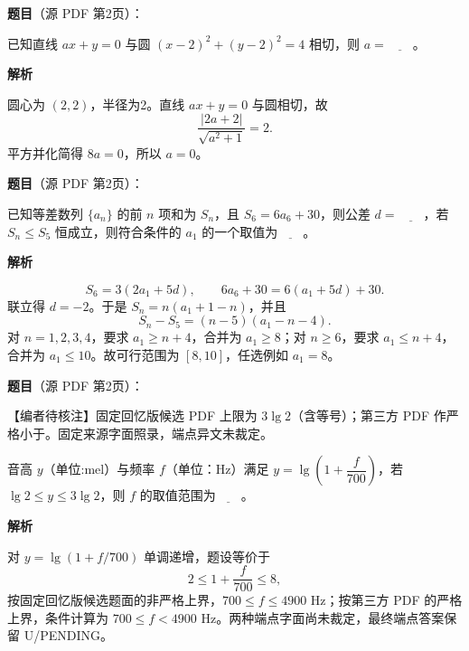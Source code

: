\begin{answer}

\textbf{题目}（源 PDF 第2页）：

已知直线 \(ax+y=0\) 与圆 \((x-2)^2+(y-2)^2=4\) 相切，则 \(a=\underline{\qquad}\)。

\textbf{解析}

圆心为 \((2,2)\)，半径为2。直线 \(ax+y=0\) 与圆相切，故
\nopagebreak[4]
\[
\frac{|2a+2|}{\sqrt{a^2+1}}=2.
\]
平方并化简得 \(8a=0\)，所以 \(a=0\)。


\end{answer}
\begin{answer}

\textbf{题目}（源 PDF 第2页）：

已知等差数列 \(\{a_n\}\) 的前 \(n\) 项和为 \(S_n\)，且 \(S_6=6a_6+30\)，则公差 \(d=\underline{\qquad}\)，若 \(S_n\leq S_5\) 恒成立，则符合条件的 \(a_1\) 的一个取值为\(\underline{\qquad}\)。

\textbf{解析}

\nopagebreak[4]
\[
S_6=3(2a_1+5d),\qquad 6a_6+30=6(a_1+5d)+30.
\]
联立得 \(d=-2\)。于是 \(S_n=n(a_1+1-n)\)，并且
\nopagebreak[4]
\[
S_n-S_5=(n-5)(a_1-n-4).
\]
对 \(n=1,2,3,4\)，要求 \(a_1\ge n+4\)，合并为 \(a_1\ge8\)；对 \(n\ge6\)，要求 \(a_1\le n+4\)，合并为 \(a_1\le10\)。故可行范围为 \([8,10]\)，任选例如 \(a_1=8\)。


\end{answer}
\begin{answer}

\textbf{题目}（源 PDF 第2页）：

\begin{gktip}
【编者待核注】固定回忆版候选 PDF 上限为 \(3\lg 2\)（含等号）；第三方 PDF 作严格小于。固定来源字面照录，端点异文未裁定。
\end{gktip}

音高 \(y\)（单位:mel）与频率 \(f\)（单位：Hz）满足 \(y=\lg\left(1+\dfrac{f}{700}\right)\)，若 \(\lg 2\leq y\leq 3\lg 2\)，则 \(f\) 的取值范围为\(\underline{\qquad}\)。

\textbf{解析}

对 \(y=\lg(1+f/700)\) 单调递增，题设等价于
\nopagebreak[4]
\[
2\le1+\frac f{700}\le8,
\]
按固定回忆版候选题面的非严格上界，\(700\le f\le4900\) Hz；按第三方 PDF 的严格上界，条件计算为 \(700\le f<4900\) Hz。两种端点字面尚未裁定，最终端点答案保留 U/PENDING。

\gkanswer{答案：U/PENDING；固定回忆版候选为 \([700,4900]\)，第三方异文对应 \([700,4900)\)}

\end{answer}
